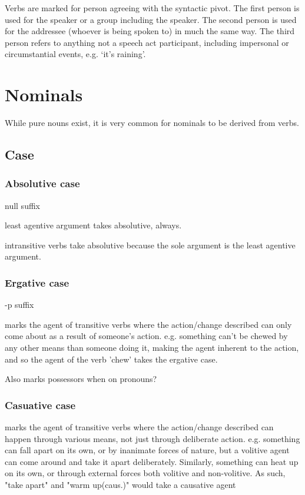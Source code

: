 \documentclass[smallroyalvopaper,9pt]{memoir}
\begin{document}
Verbs are marked for person agreeing with the syntactic pivot. The first person is used for the speaker or a group including the speaker. The second person is used for the addressee (whoever is being spoken to) in much the same way. The third person refers to anything not a speech act participant, including impersonal or circumstantial events, e.g. `it's raining'.

\chapter{Nominals}

While pure nouns exist, it is very common for nominals to be derived from verbs.

\section{Case}

\subsection{Absolutive case}

null suffix

least agentive argument takes absolutive, always. 

intransitive verbs take absolutive because the sole argument is the least agentive argument.

\subsection{Ergative case}

-p suffix

marks the agent of transitive verbs where the action/change described can only come about as a result of someone's action. e.g. something can't be chewed by any other means than someone doing it, making the agent inherent to the action, and so the agent of the verb 'chew' takes the ergative case. 

Also marks possessors when on pronouns?

\subsection{Casuative case}

marks the agent of transitive verbs where the action/change described can happen through various means, not just through deliberate action. e.g. something can fall apart on its own, or by inanimate forces of nature, but a volitive agent can come around and take it apart deliberately. Similarly, something can heat up on its own, or through external forces both volitive and non-volitive. As such, "take apart" and "warm up(caus.)" would take a causative agent
\end{document}
